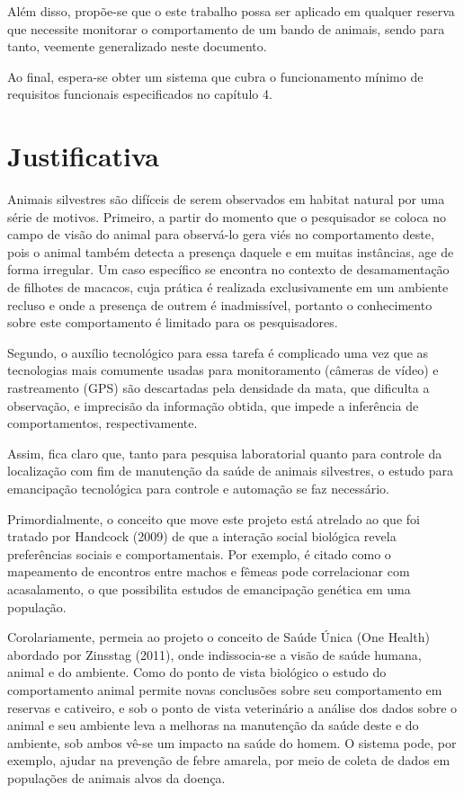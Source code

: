 Além disso, propõe-se que o este trabalho possa ser aplicado em qualquer reserva que necessite monitorar o comportamento de um bando de animais, sendo para tanto, veemente generalizado neste documento.

Ao final, espera-se obter um sistema que cubra o funcionamento mínimo de requisitos funcionais especificados no capítulo 4.

\section{Justificativa}
Animais silvestres são difíceis de serem observados em habitat natural por uma série de motivos. Primeiro, a partir do momento que o pesquisador se coloca no campo de visão do animal para observá-lo gera viés no comportamento deste, pois o animal também detecta a presença daquele e em muitas instâncias, age de forma irregular. Um caso específico se encontra no contexto de desamamentação de filhotes de macacos, cuja prática é realizada exclusivamente em um ambiente recluso e onde a presença de outrem é inadmissível, portanto o conhecimento sobre este comportamento é limitado para os pesquisadores.

Segundo, o auxílio tecnológico para essa tarefa é complicado uma vez que as tecnologias mais comumente usadas para monitoramento (câmeras de vídeo)  e rastreamento (GPS) são descartadas pela densidade da mata, que dificulta a observação, e imprecisão da informação obtida, que impede a inferência de comportamentos, respectivamente.

Assim, fica claro que, tanto para pesquisa laboratorial quanto para controle da localização com fim de manutenção da saúde de animais silvestres, o estudo para emancipação tecnológica para controle e automação se faz necessário.

Primordialmente, o conceito que move este projeto está atrelado ao que foi tratado por Handcock (2009) de que a interação social biológica revela preferências sociais e comportamentais. Por exemplo, é citado como o mapeamento de encontros entre machos e fêmeas pode correlacionar com acasalamento, o que possibilita estudos de emancipação genética em uma população.

Corolariamente, permeia ao projeto o conceito de Saúde Única (One Health) abordado por Zinsstag (2011), onde indissocia-se a visão de saúde humana, animal e do ambiente. Como do ponto de vista biológico o estudo do comportamento animal permite novas conclusões sobre seu comportamento em reservas e cativeiro, e sob o ponto de vista veterinário a análise dos dados sobre o animal e seu ambiente leva a melhoras na manutenção da saúde deste e do ambiente, sob ambos vê-se um impacto na saúde do homem. O sistema pode, por exemplo, ajudar na prevenção de febre amarela, por meio de coleta de dados em populações de animais alvos da doença.

